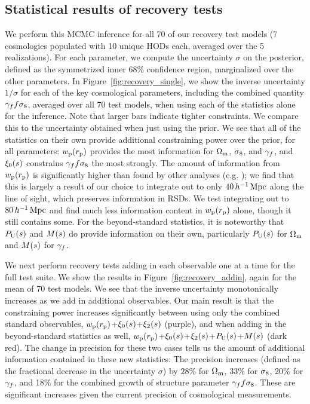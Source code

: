 \subsection{Statistical results of recovery tests}
\label{sec:recovery_statistical}

We perform this MCMC inference for all 70 of our recovery test models (7 cosmologies populated with 10 unique HODs each, averaged over the 5 realizations).
For each parameter, we compute the uncertainty $\sigma$ on the posterior, defined as the symmetrized inner 68\% confidence region, marginalized over the other parameters.
In Figure~\ref{fig:recovery_single}, we show the inverse uncertainty $1/\sigma$ for each of the key cosmological parameters, including the combined quantity $\gamma_f f\sigma_8$, averaged over all 70 test models, when using each of the statistics alone for the inference.
Note that larger bars indicate tighter constraints.
We compare this to the uncertainty obtained when just using the prior.
We see that all of the statistics on their own provide additional constraining power over the prior, for all parameters: $w_\mathrm{p}(r_\mathrm{p})$ provides the most information for $\Omega_\mathrm{m}$, $\sigma_\mathrm{8}$, and $\gamma_f$, and $\xi_0(s)$ constrains $\gamma_f f\sigma_8$ the most strongly.
The amount of information from $w_\mathrm{p}(r_\mathrm{p})$ is significantly higher than found by other analyses (e.g. \citealt{Lange2022}); we find that this is largely a result of our choice to integrate out to only $40\,h^{-1}\,\mathrm{Mpc}$ along the line of sight, which preserves information in RSDs.
We test integrating out to $80\,h^{-1}\,\mathrm{Mpc}$ and find much less information content in $w_\mathrm{p}(r_\mathrm{p})$ alone, though it still contains some.
For the beyond-standard statistics, it is noteworthy that $P_\mathrm{U}(s)$ and $M(s)$ do provide information on their own, particularly $P_\mathrm{U}(s)$ for $\Omega_\mathrm{m}$ and $M(s)$ for $\gamma_f$. 

We next perform recovery tests adding in each observable one at a time for the full test suite.
We show the results in Figure~\ref{fig:recovery_addin}, again for the mean of 70 test models.
We see that the inverse uncertainty monotonically increases as we add in additional observables.
Our main result is that the constraining power increases significantly between using only the combined standard observables, $w_\mathrm{p}(r_\mathrm{p})$+$\xi_0(s)$+$\xi_2(s)$ (purple), and when adding in the beyond-standard statistics as well, $w_\mathrm{p}(r_\mathrm{p})$+$\xi_0(s)$+$\xi_2(s)$+$P_\mathrm{U}(s)$+$M(s)$ (dark red).
The change in precision for these two cases tells us the amount of additional information contained in these new statistics: 
The precision increases (defined as the fractional decrease in the uncertainty $\sigma$) by 28\% for $\Omega_\mathrm{m}$, 33\% for $\sigma_\mathrm{8}$, 20\% for $\gamma_f$, and 18\% for the combined growth of structure parameter $\gamma_f f\sigma_8$.
These are significant increases given the current precision of cosmological measurements.

